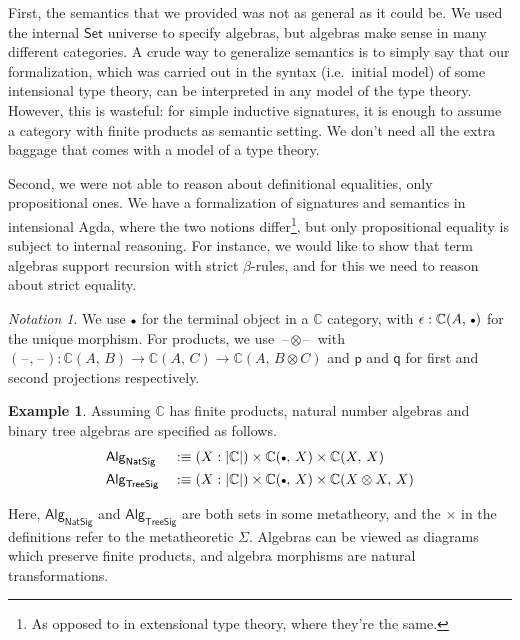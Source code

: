 \documentclass[12pt,a4paper,twoside,openany]{book}
\theoremstyle{remark}
\newtheorem{notation}{Notation}
\theoremstyle{definition}
\newtheorem{myexample}{Example}
\theoremstyle{theorem}
\newcommand{\ms}[1]{\mathsf{#1}}
\newcommand{\mbb}[1]{\mathbb{#1}}
\newcommand{\blank}{\mathord{\hspace{1pt}\text{--}\hspace{1pt}}}
\newcommand{\Set}{\mathsf{Set}}
\newcommand{\emptycon}{\scaleobj{.75}\bullet}
\newcommand{\p}{\mathsf{p}}
\newcommand{\q}{\mathsf{q}}
\newcommand{\Alg}{\ms{Alg}}
\newcommand{\mbbC}{\mbb{C}}
\newcommand{\defn}{:\equiv}
\begin{document}
First, the semantics that we provided was not as general as it could be. We
used the internal $\Set$ universe to specify algebras, but algebras make sense
in many different categories. A crude way to generalize semantics is to simply
say that our formalization, which was carried out in the syntax (i.e.\ initial
model) of some intensional type theory, can be interpreted in any model of the
type theory. However, this is wasteful: for simple inductive signatures, it is
enough to assume a category with finite products as semantic setting. We don't
need all the extra baggage that comes with a model of a type theory.

Second, we were not able to reason about definitional equalities, only
propositional ones. We have a formalization of signatures and semantics in
intensional Agda, where the two notions differ\footnote{As opposed to in
extensional type theory, where they're the same.}, but only propositional
equality is subject to internal reasoning. For instance, we would like to show
that term algebras support recursion with strict $\beta$-rules, and for this we
need to reason about strict equality.

\begin{notation}
We use $\emptycon$ for the terminal object in a $\mbb{C}$ category, with
$\epsilon : \mbb{C}(A,\,\emptycon)$ for the unique morphism. For products, we
use $\blank\!\otimes\!\blank$ with $(\blank\!,\!\blank) : \mbb{C}(A,\,B) \to
\mbb{C}(A,\,C) \to \mbb{C}(A,\,B\otimes C)$ and $\p$ and $\q$ for
first and second projections respectively.
\end{notation}

\begin{myexample}
Assuming $\mbbC$ has finite products, natural number algebras and binary tree
algebras are specified as follows.
\begin{alignat*}{3}
  &\Alg_{\ms{NatSig}} &&\defn (X : |\mbbC|) \times \mbbC(\emptycon,\,X) \times \mbbC(X,\,X)\\
  &\Alg_{\ms{TreeSig}}&& \defn (X : |\mbbC|) \times \mbbC(\emptycon,\,X) \times \mbbC(X \otimes X,\,X)
\end{alignat*}
\end{myexample}
Here, $\Alg_{\ms{NatSig}}$ and $\Alg_{\ms{TreeSig}}$ are both sets in some
metatheory, and the $\times$ in the definitions refer to the metatheoretic
$\Sigma$. Algebras can be viewed as diagrams which preserve finite products, and
algebra morphisms are natural transformations.
\end{document}

